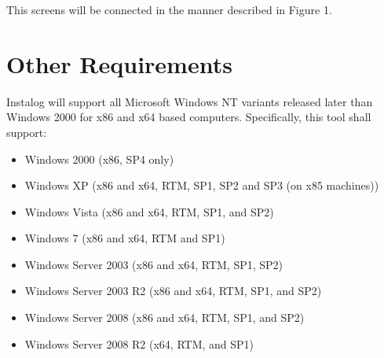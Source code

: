 \documentclass[letterpaper,12pt]{article}
\begin{document}
This screens will be connected in the manner described in Figure 1.

\newpage



\section{Other Requirements}
Instalog will support all Microsoft Windows NT variants released later than
Windows 2000 for x86 and x64 based computers.  Specifically, this tool shall
support:
\begin{itemize}
  \item Windows 2000 (x86, SP4 only)
  \item Windows XP (x86 and x64, RTM, SP1, SP2 and SP3 (on x85 machines))
  \item Windows Vista (x86 and x64, RTM, SP1, and SP2)
  \item Windows 7 (x86 and x64, RTM and SP1)
  \item Windows Server 2003 (x86 and x64, RTM, SP1, SP2)
  \item Windows Server 2003 R2 (x86 and x64, RTM, SP1, and SP2)
  \item Windows Server 2008 (x86 and x64, RTM, SP1, and SP2)
  \item Windows Server 2008 R2 (x64, RTM, and SP1)
\end{itemize}

\newpage
\end{document}
